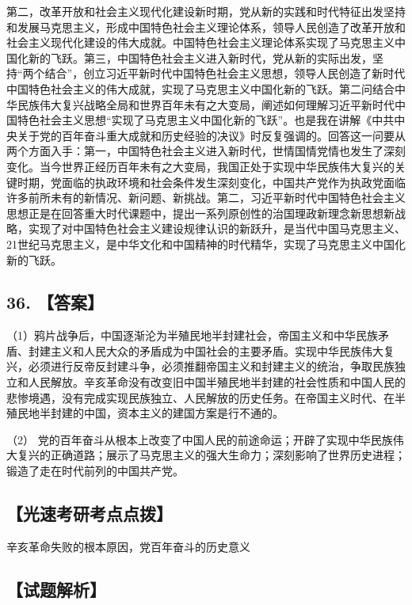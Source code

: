\documentclass[UTF8,11pt]{ctexart}
\begin{document}
第二，改革开放和社会主义现代化建设新时期，党从新的实践和时代特征出发坚持和发展马克思主义，形成中国特色社会主义理论体系，领导人民创造了改革开放和社会主义现代化建设的伟大成就。中国特色社会主义理论体系实现了马克思主义中国化新的飞跃。第三，中国特色社会主义进入新时代，党从新的实际出发，坚持“两个结合”，创立习近平新时代中国特色社会主义思想，领导人民创造了新时代中国特色社会主义的伟大成就，实现了马克思主义中国化新的飞跃。第二问结合中华民族伟大复兴战略全局和世界百年未有之大变局，阐述如何理解习近平新时代中国特色社会主义思想“实现了马克思主义中国化新的飞跃”。也是我在讲解《中共中央关于党的百年奋斗重大成就和历史经验的决议》时反复强调的。回答这一问要从两个方面入手：第一，中国特色社会主义进入新时代，世情国情党情也发生了深刻变化。当今世界正经历百年未有之大变局，我国正处于实现中华民族伟大复兴的关键时期，党面临的执政环境和社会条件发生深刻变化，中国共产党作为执政党面临许多前所未有的新情况、新问题、新挑战。第二，习近平新时代中国特色社会主义思想正是在回答重大时代课题中，提出一系列原创性的治国理政新理念新思想新战略，实现了对中国特色社会主义建设规律认识的新跃升，是当代中国马克思主义、21世纪马克思主义，是中华文化和中国精神的时代精华，实现了马克思主义中国化新的飞跃。


\subsection*{36. 【答案】}

（1）鸦片战争后，中国逐渐沦为半殖民地半封建社会，帝国主义和中华民族矛盾、封建主义和人民大众的矛盾成为中国社会的主要矛盾。实现中华民族伟大复兴，必须进行反帝反封建斗争，必须推翻帝国主义和封建主义的统治，争取民族独立和人民解放。辛亥革命没有改变旧中国半殖民地半封建的社会性质和中国人民的悲惨境遇，没有完成实现民族独立、人民解放的历史任务。在帝国主义时代、在半殖民地半封建的中国，资本主义的建国方案是行不通的。


（2） 党的百年奋斗从根本上改变了中国人民的前途命运；开辟了实现中华民族伟大复兴的正确道路；展示了马克思主义的强大生命力；深刻影响了世界历史进程；锻造了走在时代前列的中国共产党。


\subsection*{【光速考研考点点拨】}

辛亥革命失败的根本原因，党百年奋斗的历史意义


\subsection*{【试题解析】}
\end{document}
